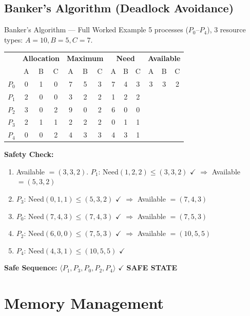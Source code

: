 \documentclass[12pt,a4paper]{article}
\begin{document}
\subsection{Banker's Algorithm (Deadlock Avoidance)}
\begin{examplebox}{Banker's Algorithm --- Full Worked Example}
5 processes ($P_0$--$P_4$), 3 resource types: $A=10, B=5, C=7$.

\begin{center}
\begin{tabular}{@{} c ccc ccc ccc ccc @{}}
\toprule
& \multicolumn{3}{c}{\textbf{Allocation}} & \multicolumn{3}{c}{\textbf{Maximum}} & \multicolumn{3}{c}{\textbf{Need}} & \multicolumn{3}{c}{\textbf{Available}} \\
& A & B & C & A & B & C & A & B & C & A & B & C \\
\midrule
$P_0$ & 0 & 1 & 0 & 7 & 5 & 3 & 7 & 4 & 3 & 3 & 3 & 2 \\
$P_1$ & 2 & 0 & 0 & 3 & 2 & 2 & 1 & 2 & 2 & & & \\
$P_2$ & 3 & 0 & 2 & 9 & 0 & 2 & 6 & 0 & 0 & & & \\
$P_3$ & 2 & 1 & 1 & 2 & 2 & 2 & 0 & 1 & 1 & & & \\
$P_4$ & 0 & 0 & 2 & 4 & 3 & 3 & 4 & 3 & 1 & & & \\
\bottomrule
\end{tabular}
\end{center}

\textbf{Safety Check:}
\begin{enumerate}
    \item Available $=(3,3,2)$. $P_1$: Need$(1,2,2) \leq (3,3,2)$ $\checkmark$ $\Rightarrow$ Available $= (5,3,2)$
    \item $P_3$: Need$(0,1,1) \leq (5,3,2)$ $\checkmark$ $\Rightarrow$ Available $= (7,4,3)$
    \item $P_0$: Need$(7,4,3) \leq (7,4,3)$ $\checkmark$ $\Rightarrow$ Available $= (7,5,3)$
    \item $P_2$: Need$(6,0,0) \leq (7,5,3)$ $\checkmark$ $\Rightarrow$ Available $= (10,5,5)$
    \item $P_4$: Need$(4,3,1) \leq (10,5,5)$ $\checkmark$
\end{enumerate}
\textbf{Safe Sequence:} $\langle P_1, P_3, P_0, P_2, P_4 \rangle$ \quad $\checkmark$ \textbf{SAFE STATE}
\end{examplebox}

\section{Memory Management}
\end{document}
